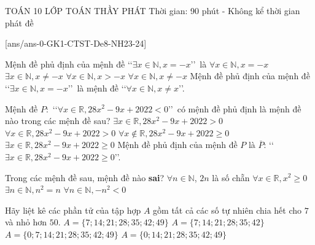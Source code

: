 \begin{name}
	{\tenchude}
	{TOÁN 10}
	{LỚP TOÁN THẦY PHÁT}
	{Thời gian: 90 phút - Không kể thời gian phát đề}
\end{name}
[ans/ans-0-GK1-CTST-De8-NH23-24]

\begin{ex}%
	Mệnh đề phủ định của mệnh đề \lq\lq  $\exists x\in \mathbb{N}, x=-x$\rq\rq \, là 
	\choice
	{$\forall x\in \mathbb{N}, x=-x$}
	{$\exists x\in \mathbb{N}, x\ne -x$}
	{$\forall x\in \mathbb{N}, x>-x$}
	{\True $\forall x\in \mathbb{N}, x\ne -x$}
	\loigiai
	{
	Mệnh đề phủ định của mệnh đề \lq\lq  $\exists x\in \mathbb{N}, x=-x$\rq\rq \, là mệnh đề \lq\lq  $\forall x\in \mathbb{N}, x\ne x$\rq\rq.	
	}
\end{ex}

\begin{ex}%
	Mệnh đề $P\colon$ \lq\lq  $\forall x\in \mathbb{R}, 28x^2-9x+2022<0$\rq\rq\, có mệnh đề phủ định là mệnh đề nào trong các mệnh đề sau?
	\choice
	{$\exists x\in \mathbb{R}, 28x^2-9x+2022>0$}
	{$\forall x\in \mathbb{R}, 28x^2-9x+2022>0$}
	{$\forall x\notin \mathbb{R}, 28x^2-9x+2022\ge 0$}
	{\True $\exists x\in \mathbb{R}, 28x^2-9x+2022\ge 0$}
	\loigiai
	{
	Mệnh đề phủ định của mệnh đề $P$ là $\overline{P}$: \lq\lq  $\exists x\in \mathbb{R}, 28x^2-9x+2022\ge 0$\rq\rq.	
	}
\end{ex}

\begin{ex}%
Trong các mệnh đề sau, mệnh đề nào {\bf sai}?
\choice
{$\forall n\in \mathbb{N}$, $2n$ là số chẵn}
{$\forall x\in \mathbb{R}, x^2\ge 0$}
{$\exists n\in \mathbb{N}, n^2=n$}
{\True $\forall n\in \mathbb{N}, -n^2<0$}
\end{ex}

\begin{ex}%
Hãy liệt kê các phần tử của tập hợp $A$ gồm tất cả các số tự nhiên chia hết cho $7$ và nhỏ hơn $50$.
\choice
{$A=\{ 7; 14; 21; 28; 35; 42; 49  \}$}
{$A=\{ 7; 14; 21; 28; 35; 42 \}$}
{\True $A=\{0; 7; 14; 21; 28; 35; 42; 49  \}$}
{$A=\{  0; 14; 21; 28; 35; 42; 49\}$}
\end{ex}

